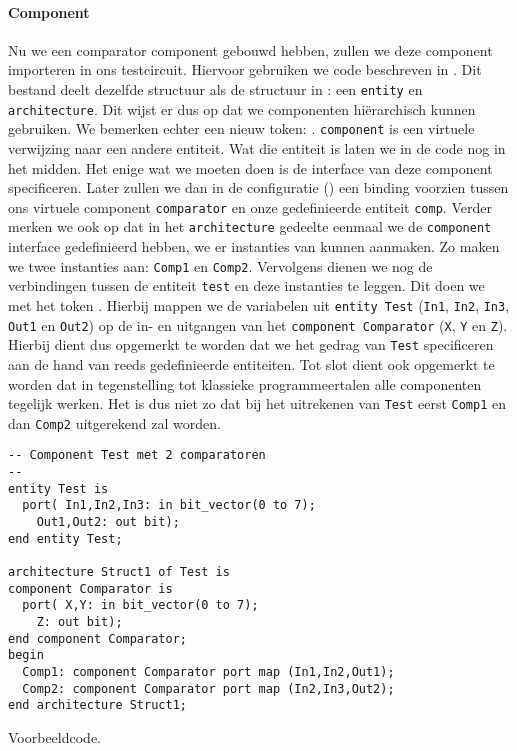 \paragraph{Component} Nu we een comparator component gebouwd hebben, zullen we deze component importeren in ons testcircuit. Hiervoor gebruiken we code beschreven in . Dit bestand deelt dezelfde structuur als de structuur in : een \texttt{entity} en \texttt{architecture}. Dit wijst er dus op dat we componenten hi\"erarchisch kunnen gebruiken. We bemerken echter een nieuw token: . \texttt{component} is een virtuele verwijzing naar een andere entiteit. Wat die entiteit is laten we in de code nog in het midden. Het enige wat we moeten doen is de interface van deze component specificeren. Later zullen we dan in de configuratie () een binding voorzien tussen ons virtuele component \texttt{comparator} en onze gedefinieerde entiteit \texttt{comp}. Verder merken we ook op dat in het \texttt{architecture} gedeelte eenmaal we de \texttt{component} interface gedefinieerd hebben, we er instanties van kunnen aanmaken. Zo maken we twee instanties aan: \texttt{Comp1} en \texttt{Comp2}. Vervolgens dienen we nog de verbindingen tussen de entiteit \texttt{test} en deze instanties te leggen. Dit doen we met het token . Hierbij mappen we de variabelen uit \texttt{entity Test} (\texttt{In1}, \texttt{In2}, \texttt{In3}, \texttt{Out1} en \texttt{Out2}) op de in- en uitgangen van het \texttt{component Comparator} (\texttt{X}, \texttt{Y} en \texttt{Z}). Hierbij dient dus opgemerkt te worden dat we het gedrag van \texttt{Test} specificeren aan de hand van reeds gedefinieerde entiteiten. Tot slot dient ook opgemerkt te worden dat in tegenstelling tot klassieke programmeertalen alle componenten tegelijk werken. Het is dus niet zo dat bij het uitrekenen van \texttt{Test} eerst \texttt{Comp1} en dan \texttt{Comp2} uitgerekend zal worden.
\begin{vhdlcode}
\centering
\begin{lstlisting}
-- Component Test met 2 comparatoren
--
entity Test is
  port(	In1,In2,In3: in bit_vector(0 to 7);
	Out1,Out2: out bit);
end entity Test;

architecture Struct1 of Test is
component Comparator is
  port(	X,Y: in bit_vector(0 to 7);
	Z: out bit);
end component Comparator;
begin
  Comp1: component Comparator port map (In1,In2,Out1);
  Comp2: component Comparator port map (In2,In3,Out2);
end architecture Struct1;
\end{lstlisting}
\caption{Voorbeeldcode.}
\label{vhdl:test}
\end{vhdlcode}
